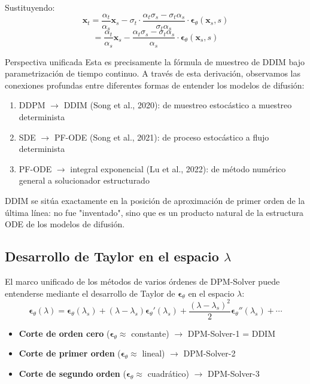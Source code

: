 \documentclass[a4paper]{article}
\begin{document}
Sustituyendo:
$$\mathbf{x}_t = \frac{\alpha_t}{\alpha_s} \mathbf{x}_s - \sigma_t \cdot \frac{\alpha_t \sigma_s - \sigma_t \alpha_s}{\sigma_t \alpha_s} \cdot \boldsymbol{\epsilon}_\theta(\mathbf{x}_s, s)$$
$$= \frac{\alpha_t}{\alpha_s} \mathbf{x}_s - \frac{\alpha_t \sigma_s - \sigma_t \alpha_s}{\alpha_s} \cdot \boldsymbol{\epsilon}_\theta(\mathbf{x}_s, s)$$

\begin{importantbox}{Perspectiva unificada}
Esta es precisamente la fórmula de muestreo de DDIM bajo parametrización de tiempo continuo. A través de esta derivación, observamos las conexiones profundas entre diferentes formas de entender los modelos de difusión:
\begin{enumerate}
    \item DDPM $\to$ DDIM (Song et al., 2020): de muestreo estocástico a muestreo determinista
    \item SDE $\to$ PF-ODE (Song et al., 2021): de proceso estocástico a flujo determinista
    \item PF-ODE $\to$ integral exponencial (Lu et al., 2022): de método numérico general a solucionador estructurado
\end{enumerate}
DDIM se sitúa exactamente en la posición de aproximación de primer orden de la última línea: no fue "inventado", sino que es un producto natural de la estructura ODE de los modelos de difusión.
\end{importantbox}

\subsection{Desarrollo de Taylor en el espacio $\lambda$}

El marco unificado de los métodos de varios órdenes de DPM-Solver puede entenderse mediante el desarrollo de Taylor de $\boldsymbol{\epsilon}_\theta$ en el espacio $\lambda$:
$$\boldsymbol{\epsilon}_\theta(\lambda) = \boldsymbol{\epsilon}_\theta(\lambda_s) + (\lambda - \lambda_s) \boldsymbol{\epsilon}_\theta'(\lambda_s) + \frac{(\lambda - \lambda_s)^2}{2} \boldsymbol{\epsilon}_\theta''(\lambda_s) + \cdots$$

\begin{itemize}
    \item \textbf{Corte de orden cero} ($\boldsymbol{\epsilon}_\theta \approx$ constante) $\to$ DPM-Solver-1 = DDIM
    \item \textbf{Corte de primer orden} ($\boldsymbol{\epsilon}_\theta \approx$ lineal) $\to$ DPM-Solver-2
    \item \textbf{Corte de segundo orden} ($\boldsymbol{\epsilon}_\theta \approx$ cuadrático) $\to$ DPM-Solver-3
\end{itemize}
\end{document}
